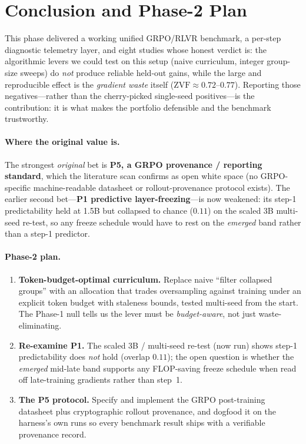 \documentclass[11pt,a4paper]{article}
\newcommand{\zvf}{\mathrm{ZVF}}
\begin{document}
\section{Conclusion and Phase-2 Plan}
\label{sec:conclusion}

This phase delivered a working unified GRPO/RLVR benchmark, a per-step diagnostic
telemetry layer, and eight studies whose honest verdict is: the algorithmic
levers we could test on this setup (naive curriculum, integer group-size sweeps)
do \emph{not} produce reliable held-out gains, while the large and reproducible
effect is the \emph{gradient waste} itself ($\zvf \approx 0.72$--$0.77$). Reporting
those negatives---rather than the cherry-picked single-seed positives---is the
contribution: it is what makes the portfolio defensible and the benchmark
trustworthy.

\paragraph{Where the original value is.} The strongest \emph{original} bet is
\textbf{P5, a GRPO provenance / reporting standard}, which the literature scan
confirms as open white space (no GRPO-specific machine-readable datasheet or
rollout-provenance protocol exists). The earlier second bet---\textbf{P1 predictive
layer-freezing}---is now weakened: its step-1 predictability held at 1.5B but collapsed
to chance ($0.11$) on the scaled 3B multi-seed re-test, so any freeze schedule would
have to rest on the \emph{emerged} band rather than a step-1 predictor.

\paragraph{Phase-2 plan.}
\begin{enumerate}[leftmargin=1.4em,itemsep=2pt]
  \item \textbf{Token-budget-optimal curriculum.} Replace naive ``filter collapsed
  groups'' with an allocation that trades oversampling against training under an
  explicit token budget with staleness bounds, tested multi-seed from the start.
  The Phase-1 null tells us the lever must be \emph{budget-aware}, not just
  waste-eliminating.
  \item \textbf{Re-examine P1.} The scaled 3B / multi-seed re-test (now run) shows
  step-1 predictability does \emph{not} hold (overlap $0.11$); the open question is whether
  the \emph{emerged} mid-late band supports any FLOP-saving freeze schedule when read off
  late-training gradients rather than step~1.
  \item \textbf{The P5 protocol.} Specify and implement the GRPO post-training
  datasheet plus cryptographic rollout provenance, and dogfood it on the harness's
  own runs so every benchmark result ships with a verifiable provenance record.
\end{enumerate}
\end{document}

